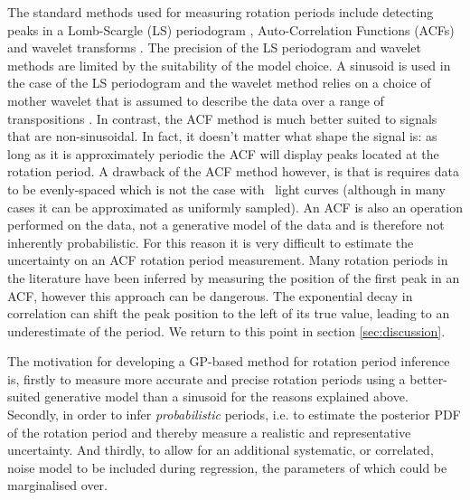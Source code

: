 The standard methods used for measuring rotation periods include detecting
peaks in a Lomb-Scargle \citep{Lomb1976, Scargle1982} (LS) periodogram
\citep[e.g.][]{Reinhold2013}, Auto-Correlation Functions (ACFs)
\citep{Mcquillan2013} and wavelet transforms \citep{Garcia2014}.
The precision of the LS periodogram and wavelet methods are limited by the
suitability of the model choice.
A sinusoid is used in the case of the LS periodogram and the wavelet method
relies on a choice of mother wavelet that is assumed to describe the data over
a range of transpositions \citep[see, \eg][]{Carter2010}.
In contrast, the ACF method is much better suited to signals that are
non-sinusoidal.
In fact, it doesn't matter what shape the signal is: as long as it is
approximately periodic the ACF will display peaks located at the rotation
period.
A drawback of the ACF method however, is that is requires data to be
evenly-spaced which is not the case with \Kepler\ light curves (although in
many cases it can be approximated as uniformly sampled).
An ACF is also an operation performed on the data, not a generative model of
the data and is therefore not inherently probabilistic.
For this reason it is very difficult to estimate the uncertainty on an ACF
rotation period measurement.
Many rotation periods in the literature have been inferred by measuring the
position of the first peak in an ACF, however this approach can be dangerous.
The exponential decay in correlation can shift the peak position to the left
of its true value, leading to an underestimate of the period.
We return to this point in section \textsection \ref{sec:discussion}.

The motivation for developing a GP-based method for rotation period inference
is, firstly to measure more accurate and precise rotation periods using a
better-suited generative model than a sinusoid for the reasons explained
above.
Secondly, in order to infer {\it probabilistic} periods, i.e. to estimate the
posterior PDF of the rotation period and thereby measure a realistic and
representative uncertainty.
And thirdly, to allow for an additional systematic, or correlated, noise model
to be included during regression, the parameters of which could be
marginalised over.

